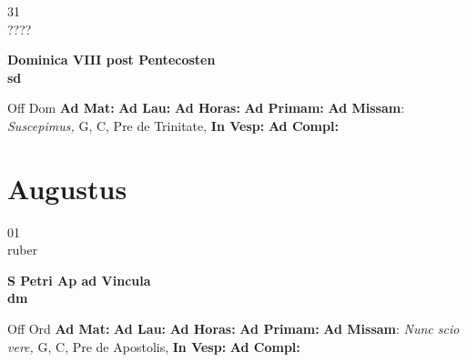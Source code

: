 \documentclass[10pt, openany]{book}
\begin{document}
    \begin{center}
        \begin{minipage}{3.5in}
            \vspace{2em}
            \begin{minipage}{0.5in}
                {\Huge 31} \\
                {\normalsize ????}
            \end{minipage}
            \begin{minipage}{3.0in}
                \textbf{ \large Dominica VIII post Pentecosten \\
                \textnormal{\normalsize sd}}

            \end{minipage}
            \begin{justify}Off Dom
                \textbf{Ad Mat: }
                \textbf{Ad Lau: }
                \textbf{Ad Horas: }
                \textbf{Ad Primam: }\textbf{Ad Missam}: \textit{Suscepimus,} G, C, Pre de Trinitate, 
                \textbf{In Vesp: }
                \textbf{Ad Compl: }
            \end{justify}
        \end{minipage}
    \end{center}

    \chapter{Augustus}
                    
    \begin{center}
        \begin{minipage}{3.5in}
            \vspace{2em}
            \begin{minipage}{0.5in}
                {\Huge 01} \\
                {\normalsize ruber}
            \end{minipage}
            \begin{minipage}{3.0in}
                \textbf{ \large S Petri Ap ad Vincula \\
                \textnormal{\normalsize dm}}

            \end{minipage}
            \begin{justify}Off Ord
                \textbf{Ad Mat: }
                \textbf{Ad Lau: }
                \textbf{Ad Horas: }
                \textbf{Ad Primam: }\textbf{Ad Missam}: \textit{Nunc scio vere,} G, C, Pre de Apostolis, 
                \textbf{In Vesp: }
                \textbf{Ad Compl: }
            \end{justify}
        \end{minipage}
    \end{center}
\end{document}
